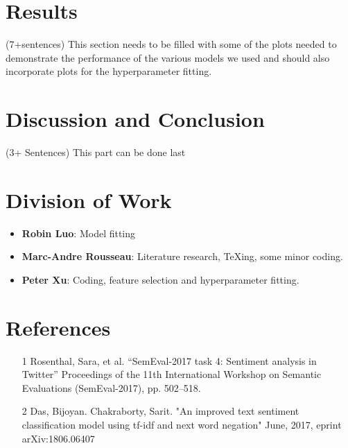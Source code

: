 \documentclass{amsart}
\theoremstyle{definition}
\theoremstyle{remark}
\numberwithin{equation}{section}
\begin{document}
\section{Results} (7+sentences)
This section needs to be filled with some of the plots needed to demonstrate the performance of the various models we used and should also incorporate plots for the hyperparameter fitting.
\section{Discussion and Conclusion}(3+ Sentences)
This part can be done last
\section{Division of Work}
\begin{itemize}
\item{\textbf{Robin Luo}}: Model fitting 
\item{\textbf{Marc-Andre Rousseau}}: Literature research, TeXing, some minor coding.
\item{\textbf{Peter Xu}}: Coding, feature selection and hyperparameter fitting.
\end{itemize}
\section{References}
\begin{itemize}
	\item [1] Rosenthal, Sara, et al. “SemEval-2017 task 4: Sentiment analysis in Twitter” Proceedings of the 11th International Workshop on Semantic Evaluations (SemEval-2017), pp. 502–518.
	\item [2] Das, Bijoyan. Chakraborty, Sarit. "An improved text sentiment classification model using tf-idf and next word negation" June, 2017, eprint arXiv:1806.06407
\end{itemize}
\end{document}
